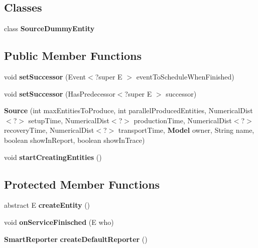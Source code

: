 \subsection*{Classes}
\begin{DoxyCompactItemize}
\item 
class {\bfseries Source\-Dummy\-Entity}
\end{DoxyCompactItemize}
\subsection*{Public Member Functions}
\begin{DoxyCompactItemize}
\item 
void {\bfseries set\-Successor} (Event$<$?super E $>$ event\-To\-Schedule\-When\-Finished)\label{classdesmoj_1_1extensions_1_1chaining_1_1_source_3_01_e_01extends_01_entity_01_4_a557f97ec7155bc7fd33550e508fa5601}

\item 
void {\bfseries set\-Successor} (Has\-Predecessor$<$?super E $>$ successor)\label{classdesmoj_1_1extensions_1_1chaining_1_1_source_3_01_e_01extends_01_entity_01_4_a0af881e993207c332c6ca7386fef9b5b}

\item 
{\bf Source} (int max\-Entities\-To\-Produce, int parallel\-Produced\-Entities, Numerical\-Dist$<$?$>$ setup\-Time, Numerical\-Dist$<$?$>$ production\-Time, Numerical\-Dist$<$?$>$ recovery\-Time, Numerical\-Dist$<$?$>$ transport\-Time, {\bf Model} owner, String name, boolean show\-In\-Report, boolean show\-In\-Trace)
\item 
void {\bf start\-Creating\-Entities} ()
\end{DoxyCompactItemize}
\subsection*{Protected Member Functions}
\begin{DoxyCompactItemize}
\item 
abstract E {\bfseries create\-Entity} ()\label{classdesmoj_1_1extensions_1_1chaining_1_1_source_3_01_e_01extends_01_entity_01_4_ac535342ee89133848747fbe2ab190a84}

\item 
void {\bf on\-Service\-Finisched} (E who)
\item 
{\bf Smart\-Reporter} {\bfseries create\-Default\-Reporter} ()\label{classdesmoj_1_1extensions_1_1chaining_1_1_source_3_01_e_01extends_01_entity_01_4_a702497514b12f976f3bb270c82a87915}

\end{DoxyCompactItemize}


